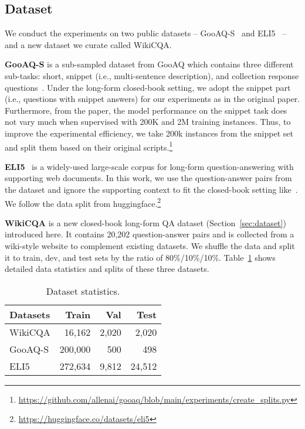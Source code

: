 \documentclass[11pt]{article}
\begin{document}
\subsection{Dataset}
We conduct the experiments on two public datasets -- GooAQ-S~\cite{khashabi-etal-2021-gooaq-open} and ELI5~\cite{fan-etal-2019-eli5} -- and a new dataset we curate called WikiCQA.

\smallskip
\noindent \textbf{GooAQ-S} is a sub-sampled dataset from GooAQ which contains three different sub-tasks: short, snippet (i.e., multi-sentence description), and collection response questions~\cite{khashabi-etal-2021-gooaq-open}. 
Under the long-form closed-book setting, we adopt the snippet part (i.e., questions with snippet answers) for our experiments as in the original paper.
Furthermore, from the paper, the model performance on the snippet task does not vary much when supervised with 200K and 2M training instances. 
Thus, to improve the experimental efficiency, we take 200k instances from the snippet set and split them based on their original scripts.\footnote{\url{https://github.com/allenai/gooaq/blob/main/experiments/create\_splits.py}}

\smallskip
\noindent \textbf{ELI5}~\cite{fan-etal-2019-eli5} is a widely-used large-scale corpus for long-form question-answering with supporting web documents.
In this work, we use the question-answer pairs from the dataset and ignore the supporting context to fit the closed-book setting like~\cite{khashabi-etal-2021-gooaq-open}.
We follow the data split from huggingface.\footnote{\url{https://huggingface.co/datasets/eli5}}


\smallskip
\noindent \textbf{WikiCQA} is a new closed-book long-form QA dataset (Section~\ref{sec:dataset}) introduced here. It contains 20,202 question-answer pairs and is collected from a wiki-style website to complement existing datasets. 
We shuffle the data and split it to train, dev, and test sets by the ratio of 80\%/10\%/10\%. Table~\ref{tab:data-split} shows detailed data statistics and splits of these three datasets.
\begin{table}[htbp!]
\centering \small
\begin{tabular}{lrrr}
\hline
\textbf{Datasets} & \textbf{Train} & \textbf{Val} & \textbf{Test}\\
\hline
WikiCQA & 16,162 & 2,020 & 2,020 \\
GooAQ-S & 200,000 & 500 & 498 \\
ELI5 & 272,634 & 9,812 & 24,512 \\
\hline
\end{tabular}
\caption{Dataset statistics.}
\label{tab:data-split}
\end{table}
\end{document}
